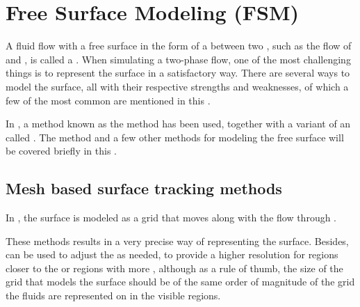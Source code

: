 \chapter{Free Surface Modeling (FSM)}

A fluid flow with a free surface in the form of a  between two , such as the flow of \water and \air, is called a . When simulating a two-phase flow, one of the most challenging things is to represent the surface in a satisfactory way. There are several ways to model the surface, all with their respective strengths and weaknesses, of which a few of the most common are mentioned in this \levelname.

In \thisprojectwork, a method known as the \VOF method has been used, together with a variant of an  called . The \VOF method and a few other methods for modeling the free surface will be covered briefly in this \levelname.



\section{Mesh based surface tracking methods}

In , the surface is modeled as a grid that moves along with the flow through .

These methods results in a very precise way of representing the surface. Besides,  can be used to adjust the  as needed, to provide a higher resolution for regions closer to the \camera or regions with more \turbulence, although as a rule of thumb, the size of the grid that models the surface should be of the same order of magnitude of the grid the fluids are represented on in the visible regions.

